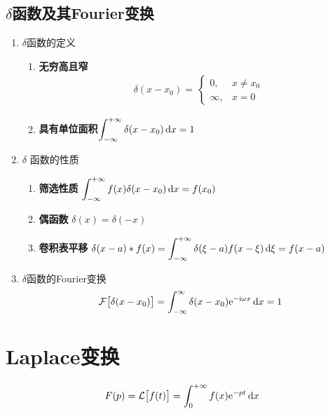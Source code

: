 \subsection{{$\delta$}函数及其Fourier变换}
\begin{enumerate}[1. ]
	\item $\delta$函数的定义
	\begin{enumerate}[\textbf{特征} 1 ]
		\item \textbf{无穷高且窄}
		\begin{align}
			\delta (x - x_0) = \,
			\begin{cases}
				0, & x \neq x_0\\
				\infty, & x = 0
			\end{cases}
		\end{align}
		
		\item \textbf{具有单位面积}\quad $\displaystyle \int_{- \infty}^{+ \infty} \delta(x - x_0)\, {\rm{d}} x = 1$
	\end{enumerate}
	
	\item $\delta$ 函数的性质
	\begin{enumerate}[\textbf{性质} 1 ]
		\item \textbf{筛选性质} \quad $\displaystyle \int_{- \infty}^{+ \infty} f(x)\delta(x - x_0) \, {\rm{d}} x = f(x_0)$
		\item \textbf{偶函数} \quad $\delta(x) = \delta(-x)$
		\item \textbf{卷积表平移} \quad $\displaystyle \delta(x - a)*f(x) = \int_{- \infty}^{+ \infty} \delta(\xi - a)f(x - \xi) \, {\rm{d}} \xi = f(x - a)$ 
	\end{enumerate}
	
	\item $\delta$函数的Fourier变换
	\begin{align}
		\mathcal{F}\big[\delta(x - x_0)\big] = \int_{-\infty}^{\infty} \delta(x - x_0) {\rm{e}}^{-{\rm{i}} \omega x}\, {\rm{d}} x = 1
	\end{align}
\end{enumerate}
\clearpage

\section{Laplace变换}
\vspace*{1em}
\ttheorem[Laplace变换]
\begin{align}
	F(p) = \mathcal{L}\big[f(t)\big] = \int_{0}^{+ \infty} f(x) {\rm{e}}^{- p t}\, {\rm{d}} x
\end{align}
\vspace*{-2em}

